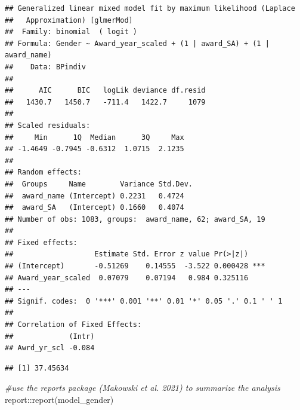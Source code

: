 \documentclass[
]{article}
\newenvironment{Shaded}{\begin{snugshade}}{\end{snugshade}}
\newcommand{\CommentTok}[1]{\textcolor[rgb]{0.56,0.35,0.01}{\textit{#1}}}
\newcommand{\DecValTok}[1]{\textcolor[rgb]{0.00,0.00,0.81}{#1}}
\newcommand{\FunctionTok}[1]{\textcolor[rgb]{0.00,0.00,0.00}{#1}}
\newcommand{\NormalTok}[1]{#1}
\newcommand{\SpecialCharTok}[1]{\textcolor[rgb]{0.00,0.00,0.00}{#1}}
\begin{document}
\begin{verbatim}
## Generalized linear mixed model fit by maximum likelihood (Laplace
##   Approximation) [glmerMod]
##  Family: binomial  ( logit )
## Formula: Gender ~ Award_year_scaled + (1 | award_SA) + (1 | award_name)
##    Data: BPindiv
## 
##      AIC      BIC   logLik deviance df.resid 
##   1430.7   1450.7   -711.4   1422.7     1079 
## 
## Scaled residuals: 
##     Min      1Q  Median      3Q     Max 
## -1.4649 -0.7945 -0.6312  1.0715  2.1235 
## 
## Random effects:
##  Groups     Name        Variance Std.Dev.
##  award_name (Intercept) 0.2231   0.4724  
##  award_SA   (Intercept) 0.1660   0.4074  
## Number of obs: 1083, groups:  award_name, 62; award_SA, 19
## 
## Fixed effects:
##                   Estimate Std. Error z value Pr(>|z|)    
## (Intercept)       -0.51269    0.14555  -3.522 0.000428 ***
## Award_year_scaled  0.07079    0.07194   0.984 0.325116    
## ---
## Signif. codes:  0 '***' 0.001 '**' 0.01 '*' 0.05 '.' 0.1 ' ' 1
## 
## Correlation of Fixed Effects:
##             (Intr)
## Awrd_yr_scl -0.084
\end{verbatim}

\begin{Shaded}
\end{Shaded}

\begin{verbatim}
## [1] 37.45634
\end{verbatim}

\begin{Shaded}
\begin{Highlighting}[]
\CommentTok{\#use the reports package (Makowski et al. 2021) to summarize the analysis}
\NormalTok{report}\SpecialCharTok{::}\FunctionTok{report}\NormalTok{(model\_gender)}
\end{Highlighting}
\end{Shaded}
\end{document}
